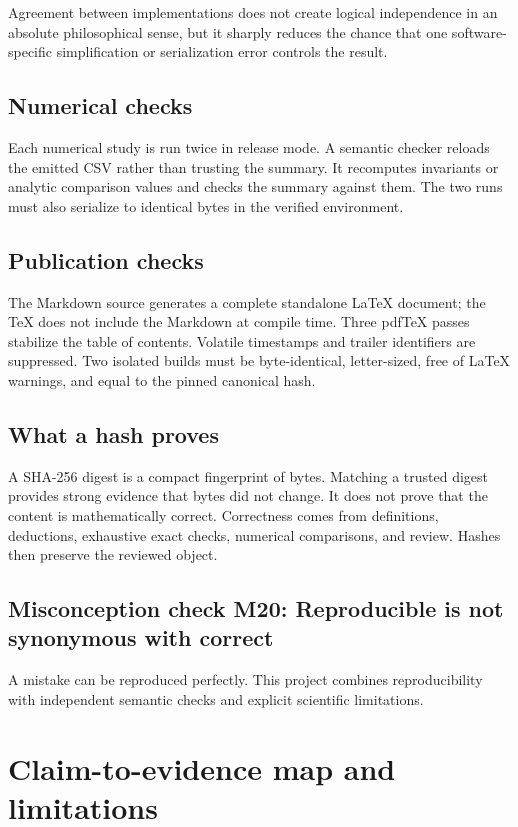 \documentclass[11pt]{article}
\begin{document}
Agreement between implementations does not create logical independence in an absolute philosophical sense, but it sharply reduces the chance that one software-specific simplification or serialization error controls the result.

\subsection{Numerical checks}

Each numerical study is run twice in release mode. A semantic checker reloads the emitted CSV rather than trusting the summary. It recomputes invariants or analytic comparison values and checks the summary against them. The two runs must also serialize to identical bytes in the verified environment.

\subsection{Publication checks}

The Markdown source generates a complete standalone LaTeX document; the TeX does not include the Markdown at compile time. Three pdfTeX passes stabilize the table of contents. Volatile timestamps and trailer identifiers are suppressed. Two isolated builds must be byte-identical, letter-sized, free of LaTeX warnings, and equal to the pinned canonical hash.

\subsection{What a hash proves}

A SHA-256 digest is a compact fingerprint of bytes. Matching a trusted digest provides strong evidence that bytes did not change. It does not prove that the content is mathematically correct. Correctness comes from definitions, deductions, exhaustive exact checks, numerical comparisons, and review. Hashes then preserve the reviewed object.

\subsection{Misconception check M20: Reproducible is not synonymous with correct}

A mistake can be reproduced perfectly. This project combines reproducibility with independent semantic checks and explicit scientific limitations.

\section{Claim-to-evidence map and limitations}
\end{document}

